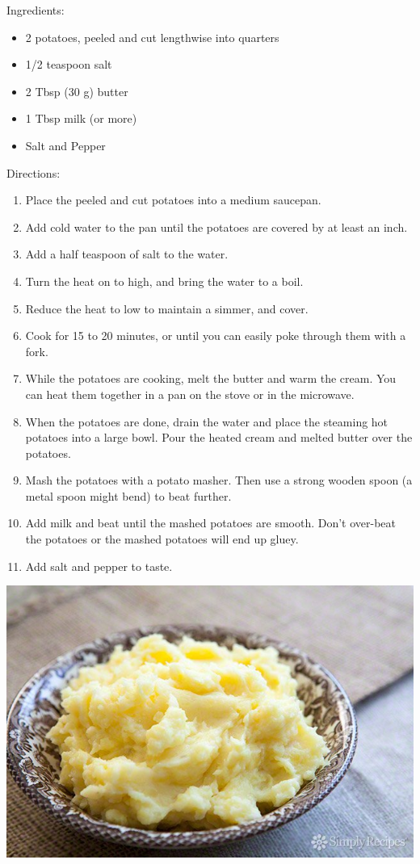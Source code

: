 \documentclass{article}
\begin{document}
%
%
%
%
%

\begin{multicols}{2}
Ingredients:
\begin{itemize}
\item 2 potatoes, peeled and cut lengthwise into quarters
\item 1/2 teaspoon salt
\item 2 Tbsp (30 g) butter
\item 1 Tbsp milk (or more)
\item Salt and Pepper
\end{itemize}
\columnbreak

Directions:
\begin{enumerate}
\item Place the peeled and cut potatoes into a medium saucepan. 
\item Add cold water to the pan until the potatoes are covered by at least an inch. 
\item Add a half teaspoon of salt to the water.
\item Turn the heat on to high, and bring the water to a boil. 
\item Reduce the heat to low to maintain a simmer, and cover. 
\item Cook for 15 to 20 minutes, or until you can easily poke through them with a fork.
\item While the potatoes are cooking, melt the butter and warm the cream. You can heat them together in a pan on the stove or in the microwave.
\item When the potatoes are done, drain the water and place the steaming hot potatoes into a large bowl. Pour the heated cream and melted butter over the potatoes.
\item Mash the potatoes with a potato masher. Then use a strong wooden spoon (a metal spoon might bend) to beat further.
\item Add milk and beat until the mashed potatoes are smooth. Don't over-beat the potatoes or the mashed potatoes will end up gluey.
\item Add salt and pepper to taste.
\end{enumerate}




\end{multicols}



\begin{center}
\includegraphics[scale=0.4]{mashedPotatoes.jpg}
\end{center}
\end{document}
